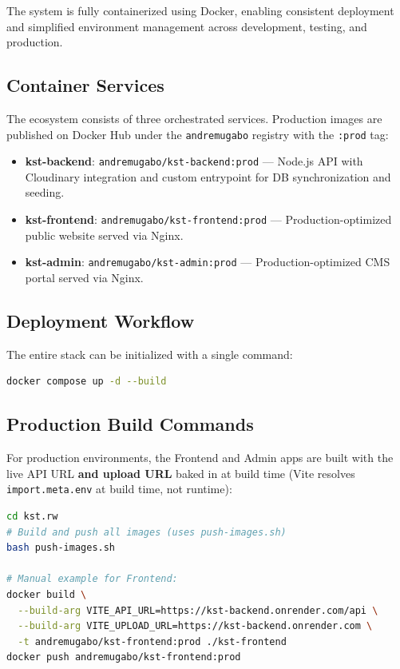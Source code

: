 \documentclass[12pt,a4paper]{article}
\begin{document}
The system is fully containerized using Docker, enabling consistent deployment and simplified environment management across development, testing, and production.

\subsection{Container Services}
The ecosystem consists of three orchestrated services. Production images are published on Docker Hub under the \texttt{andremugabo} registry with the \texttt{:prod} tag:
\begin{itemize}
    \item \textbf{kst-backend}: \texttt{andremugabo/kst-backend:prod} --- Node.js API with Cloudinary integration and custom entrypoint for DB synchronization and seeding.
    \item \textbf{kst-frontend}: \texttt{andremugabo/kst-frontend:prod} --- Production-optimized public website served via Nginx.
    \item \textbf{kst-admin}: \texttt{andremugabo/kst-admin:prod} --- Production-optimized CMS portal served via Nginx.
\end{itemize}

\subsection{Deployment Workflow}
The entire stack can be initialized with a single command:
\begin{lstlisting}[language=bash]
docker compose up -d --build
\end{lstlisting}

\subsection{Production Build Commands}
For production environments, the Frontend and Admin apps are built with the live API URL \textbf{and upload URL} baked in at build time (Vite resolves \texttt{import.meta.env} at build time, not runtime):
\begin{lstlisting}[language=bash]
cd kst.rw
# Build and push all images (uses push-images.sh)
bash push-images.sh

# Manual example for Frontend:
docker build \
  --build-arg VITE_API_URL=https://kst-backend.onrender.com/api \
  --build-arg VITE_UPLOAD_URL=https://kst-backend.onrender.com \
  -t andremugabo/kst-frontend:prod ./kst-frontend
docker push andremugabo/kst-frontend:prod
\end{lstlisting}
\end{document}
